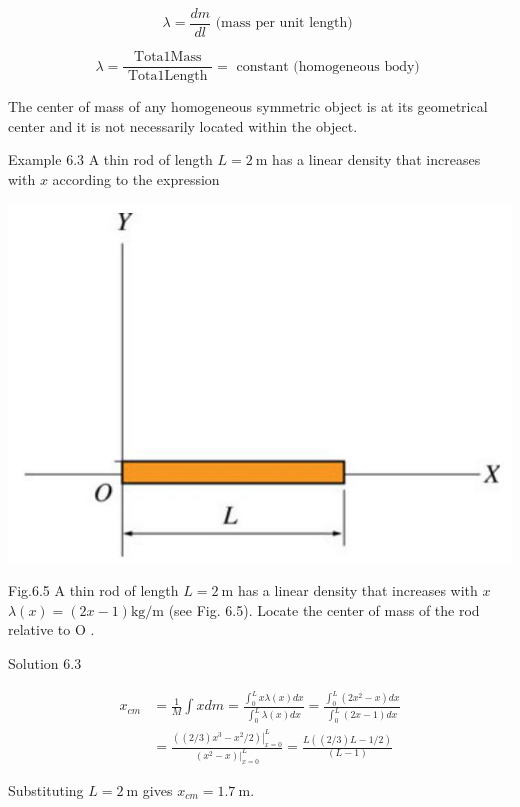\documentclass[10pt]{article}
\begin{document}
$$
\lambda=\frac{d m}{d l} \text { (mass per unit length) }
$$

$$
\lambda=\frac{\text { Tota1Mass }}{\text { Tota1Length }}=\text { constant (homogeneous body) }
$$

The center of mass of any homogeneous symmetric object is at its geometrical center and it is not necessarily located within the object.

Example 6.3 A thin rod of length $L=2 \mathrm{~m}$ has a linear density that increases with $x$ according to the expression

\begin{center}
\includegraphics[max width=\textwidth]{2024_09_13_db1f357d2aad0a03eb2eg-098(1)}
\end{center}

Fig.6.5 A thin rod of length $L=2 \mathrm{~m}$ has a linear density that increases with $x$\\
$\lambda(x)=(2 x-1) \mathrm{kg} / \mathrm{m}$ (see Fig. 6.5). Locate the center of mass of the rod relative to O .

Solution 6.3

$$
\begin{aligned}
x_{c m} & =\frac{1}{M} \int x d m=\frac{\int_{0}^{L} x \lambda(x) d x}{\int_{0}^{L} \lambda(x) d x}=\frac{\int_{0}^{L}\left(2 x^{2}-x\right) d x}{\int_{0}^{L}(2 x-1) d x} \\
& =\frac{\left.\left((2 / 3) x^{3}-x^{2} / 2\right)\right|_{x=0} ^{L}}{\left.\left(x^{2}-x\right)\right|_{x=0} ^{L}}=\frac{L((2 / 3) L-1 / 2)}{(L-1)}
\end{aligned}
$$

Substituting $L=2 \mathrm{~m}$ gives $x_{c m}=1.7 \mathrm{~m}$.
\end{document}
